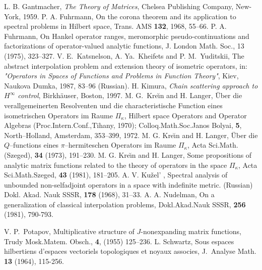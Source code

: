 \documentclass[12pt,twoside,a4paper]{amsart}
\theoremstyle{definition}
\numberwithin{equation}{section}
\begin{document}
\begin{thebibliography}{ArovD97}
      L. B. Gantmacher, \textit{The Theory of Matrices}, Chelsea
Publishing Company,
      New-York, 1959.
  P. A. Fuhrmann, On the corona theorem and its application to
  spectral problems in Hilbert space, Trans. AMS {\bf 132}, 1968,
  55--66.
  P. A. Fuhrmann, On Hankel operator ranges, meromorphic
pseudo-continuations and factorizations
  of operator-valued analytic functions, J. London Math. Soc., 13 (1975),
  323--327.
    V. E.~Katsnelson, A. Ya.~Kheifets and P. M.~Yuditskii,
    The abstract interpolation problem and extension theory of isometric
    operators, in: \textit{"Operators in Spaces of Functions and Problems in
    Function Theory"}, Kiev, Naukova Dumka, 1987, 83--96 (Russian).
        H. Kimura, \textit{Chain scattering approach to $H^\infty$
        control}, Birkh\"auser, Boston, 1997.
         M. G.~Kre\u{\i}n and H. Langer,
    \"Uber die verallgemeinerten Resolventen und die characteristische
    Function eines isometrischen Operators im Raume $\Pi_\kappa$,
    Hilbert space Operators and Operator Algebras
    (Proc.Intern.Conf.,Tihany, 1970);
    Colloq.Math.Soc.Janos Bolyai,
    {\bf 5}, North--Holland, Amsterdam, 353--399, 1972.
        M. G. Kre\u{\i}n and  H. Langer,
        \"Uber die $Q$--functions eines $\pi$--hermiteschen Operators im
        Raume $\Pi_{\kappa}$, Acta Sci.Math. (Szeged),
        {\bf 34} (1973), 191--230.
        M. G. Kre\u{\i}n  and H. Langer,
        Some propositions of analytic matrix functions related to the
        theory of  operators in the space $\Pi_{\kappa}$,
        Acta Sci.Math.Szeged, {\bf 43} (1981), 181--205.
        A. V. Ku\v zel' , Spectral analysis of unbounded
non-selfadjoint operators in a space with indefinite metric.
(Russian) Dokl. Akad. Nauk SSSR, {\bf 178} (1968), 31--33.
A. A. Nudelman, On a generalization of classical interpolation
problems, Dokl.Akad.Nauk SSSR, {\bf 256} (1981), 790-793.

        V. P.~Potapov,
        Multiplicative structure of $J$-nonexpanding matrix functions,
        Trudy Mosk.Matem. Obsch., {\bf 4}, (1955) 125--236.
    L. Schwartz,
    Sous espaces hilbertiens d'espaces vectoriels topologiques et
    noyaux associes, J.~Analyse Math. {\bf 13} (1964), 115-256.

\end{thebibliography}
\end{document}
